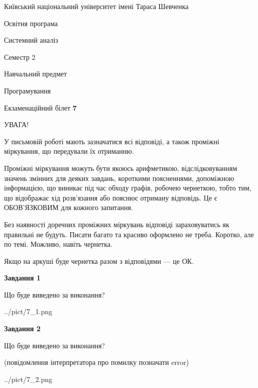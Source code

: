 \documentclass[12pt, ukrainian]{article}
\begin{document}
{{\begin {small}\par
{ \center  Київський національний університет імені Тараса Шевченка \par}
{\parbox {5 cm}{Освітня програма \hfill}{\parbox {7 cm}{Системний аналіз \hfill}}\parbox {6 cm}{\hfill Семестр 2}}\par
{\parbox {5 cm} {Навчальний предмет \hfill}\parbox {7 cm}{Програмування \hfill}\parbox {6cm}{\hfill}\par}\vspace{-7pt} \end{small}}{\center Екзаменаційний білет \No \textbf
{ 7 }\par}}
{
\begin {large}
УВАГА!

У письмовій роботі мають зазначатися всі відповіді, а також проміжні міркування, що передували їх отриманню.

Проміжні міркування можуть бути якоюсь арифметикою, відслідковуванням зна\-чень змінних для деяких завдань,
короткими поясненнями, допоміжною інформацією, що виникає під час обходу графів, робочею чернеткою,
тобто тим, що відображає хід розв’язання або пояснює отриману відповідь.
Це є ОБОВ’ЯЗКОВИМ для кожного запитання.

Без наявності доречних проміжних міркувань відповіді зараховуватись як правиль\-ні не будуть.
Писати багато та красиво оформлено не треба. Коротко, але по темі. Можли\-во, навіть чернетка.

Якщо на аркуші буде чернетка разом з відповідями --- це ОК.

\newpage

{\begin {center}\textbf{Завдання 1}\end {center}}\par
Що буде виведено за виконання?\par
\begin{center}
	{../pict/7_1.png}
\end{center}
\newpage

{\begin {center}\textbf{Завдання 2}\end {center}}\par
Що буде виведено за виконання?\par
 (повідомлення інтерпретатора про помилку позначати error)\par
\begin{center}
	{../pict/7_2.png}
\end{center}
\newpage


\end{large}}
\end{document}
